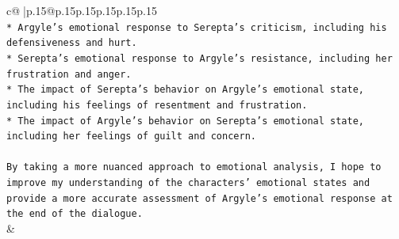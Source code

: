 \documentclass{article}
\begin{document}
{\begin{supertabular}{c@{$\;$}|p{.15\linewidth}@{}p{.15\linewidth}p{.15\linewidth}p{.15\linewidth}p{.15\linewidth}p{.15\linewidth}}
{{{\\ 
\texttt{* Argyle's emotional response to Serepta's criticism, including his defensiveness and hurt.} \\
\texttt{* Serepta's emotional response to Argyle's resistance, including her frustration and anger.} \\
\texttt{* The impact of Serepta's behavior on Argyle's emotional state, including his feelings of resentment and frustration.} \\
\texttt{* The impact of Argyle's behavior on Serepta's emotional state, including her feelings of guilt and concern.} \\
\\ 
\texttt{By taking a more nuanced approach to emotional analysis, I hope to improve my understanding of the characters' emotional states and provide a more accurate assessment of Argyle's emotional response at the end of the dialogue.} \\
            }
        }
    }
    & \\ \\

\end{supertabular}
}
\end{document}
